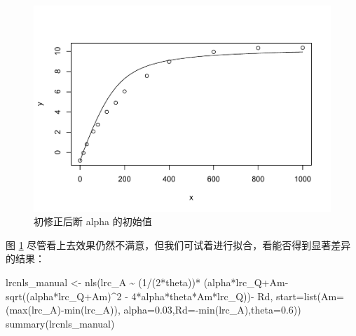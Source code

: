 \documentclass[
]{krantz}
\makeatletter
\newenvironment{Shaded}{\begin{snugshade}}{\end{snugshade}}
\newcommand{\AttributeTok}[1]{\textcolor[rgb]{0.77,0.63,0.00}{#1}}
\newcommand{\DecValTok}[1]{\textcolor[rgb]{0.00,0.00,0.81}{#1}}
\newcommand{\FloatTok}[1]{\textcolor[rgb]{0.00,0.00,0.81}{#1}}
\newcommand{\FunctionTok}[1]{\textcolor[rgb]{0.00,0.00,0.00}{#1}}
\newcommand{\NormalTok}[1]{#1}
\newcommand{\OtherTok}[1]{\textcolor[rgb]{0.56,0.35,0.01}{#1}}
\newcommand{\SpecialCharTok}[1]{\textcolor[rgb]{0.00,0.00,0.00}{#1}}
\newenvironment{kframe}{%
\medskip{}
\setlength{\fboxsep}{.8em}
 \def\at@end@of@kframe{}%
 \ifinner\ifhmode%
  \def\at@end@of@kframe{\end{minipage}}%
  \begin{minipage}{\columnwidth}%
 \fi\fi%
 \def\FrameCommand##1{\hskip\@totalleftmargin \hskip-\fboxsep
 \colorbox{shadecolor}{##1}\hskip-\fboxsep
     \hskip-\linewidth \hskip-\@totalleftmargin \hskip\columnwidth}%
 \MakeFramed {\advance\hsize-\width
   \@totalleftmargin\z@ \linewidth\hsize
   \@setminipage}}%
 {\par\unskip\endMakeFramed%
 \at@end@of@kframe}
\renewenvironment{Shaded}{\begin{kframe}}{\end{kframe}}
\makeatother
\begin{document}
\begin{figure}
\centering
\includegraphics{bookdown_files/figure-latex/alpp-1.pdf}
\caption{\label{fig:alpp}初修正后断 alpha 的初始值}
\end{figure}

图 \ref{fig:alpp} 尽管看上去效果仍然不满意，但我们可试着进行拟合，看能否得到显著差异的结果：

\begin{Shaded}
\begin{Highlighting}[]
\NormalTok{lrcnls\_manual }\OtherTok{\textless{}{-}} \FunctionTok{nls}\NormalTok{(lrc\_A }\SpecialCharTok{\textasciitilde{}} 
\NormalTok{        (}\DecValTok{1}\SpecialCharTok{/}\NormalTok{(}\DecValTok{2}\SpecialCharTok{*}\NormalTok{theta))}\SpecialCharTok{*}
\NormalTok{        (alpha}\SpecialCharTok{*}\NormalTok{lrc\_Q}\SpecialCharTok{+}\NormalTok{Am}\SpecialCharTok{{-}}\FunctionTok{sqrt}\NormalTok{((alpha}\SpecialCharTok{*}\NormalTok{lrc\_Q}\SpecialCharTok{+}\NormalTok{Am)}\SpecialCharTok{\^{}}\DecValTok{2} \SpecialCharTok{{-}} 
                               \DecValTok{4}\SpecialCharTok{*}\NormalTok{alpha}\SpecialCharTok{*}\NormalTok{theta}\SpecialCharTok{*}\NormalTok{Am}\SpecialCharTok{*}\NormalTok{lrc\_Q))}\SpecialCharTok{{-}} 
\NormalTok{        Rd, }\AttributeTok{start=}\FunctionTok{list}\NormalTok{(}\AttributeTok{Am=}\NormalTok{(}\FunctionTok{max}\NormalTok{(lrc\_A)}\SpecialCharTok{{-}}\FunctionTok{min}\NormalTok{(lrc\_A)),}
                       \AttributeTok{alpha=}\FloatTok{0.03}\NormalTok{,}\AttributeTok{Rd=}\SpecialCharTok{{-}}\FunctionTok{min}\NormalTok{(lrc\_A),}\AttributeTok{theta=}\FloatTok{0.6}\NormalTok{))}
\FunctionTok{summary}\NormalTok{(lrcnls\_manual)}
\end{Highlighting}
\end{Shaded}
\end{document}
